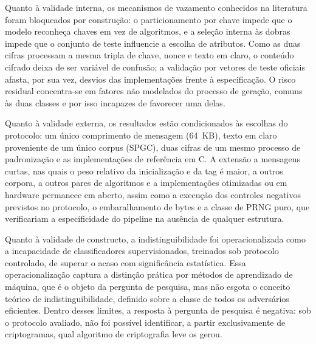 Quanto à validade interna, os mecanismos de vazamento conhecidos na literatura foram bloqueados por construção: o particionamento por chave impede que o modelo reconheça chaves em vez de algoritmos, e a seleção interna às dobras impede que o conjunto de teste influencie a escolha de atributos. Como as duas cifras processam a mesma tripla de chave, nonce e texto em claro, o conteúdo cifrado deixa de ser variável de confusão; a validação por vetores de teste oficiais afasta, por sua vez, desvios das implementações frente à especificação. O risco residual concentra-se em fatores não modelados do processo de geração, comuns às duas classes e por isso incapazes de favorecer uma delas.

Quanto à validade externa, os resultados estão condicionados às escolhas do protocolo: um único comprimento de mensagem (64~KB), texto em claro proveniente de um único corpus (SPGC), duas cifras de um mesmo processo de padronização e as implementações de referência em C. A extensão a mensagens curtas, nas quais o peso relativo da inicialização e da tag é maior, a outros corpora, a outros pares de algoritmos e a implementações otimizadas ou em hardware permanece em aberto, assim como a execução dos controles negativos previstos no protocolo, o embaralhamento de bytes e a classe de PRNG puro, que verificariam a especificidade do pipeline na ausência de qualquer estrutura.

Quanto à validade de constructo, a indistinguibilidade foi operacionalizada como a incapacidade de classificadores supervisionados, treinados sob protocolo controlado, de superar o acaso com significância estatística. Essa operacionalização captura a distinção prática por métodos de aprendizado de máquina, que é o objeto da pergunta de pesquisa, mas não esgota o conceito teórico de indistinguibilidade, definido sobre a classe de todos os adversários eficientes. Dentro desses limites, a resposta à pergunta de pesquisa é negativa: sob o protocolo avaliado, não foi possível identificar, a partir exclusivamente de criptogramas, qual algoritmo de criptografia leve os gerou.
